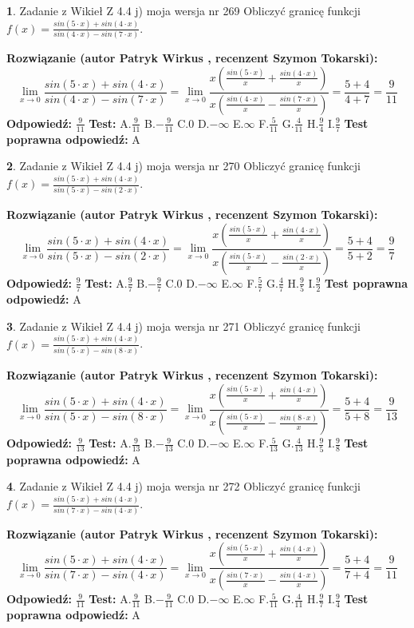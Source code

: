 \documentclass[12pt, a4paper]{article}
\theoremstyle{definition} %
\newtheorem{zad}{}
\newcommand{\zadStart}[1]{\begin{zad}#1\newline}
\newcommand{\zadStop}{\end{zad}}
\newcommand{\rozwStart}[2]{\noindent \textbf{Rozwiązanie (autor #1 , recenzent #2): }\newline}
\newcommand{\rozwStop}{\newline}
\newcommand{\odpStart}{\noindent \textbf{Odpowiedź:}\newline}
\newcommand{\odpStop}{\newline}
\newcommand{\testStart}{\noindent \textbf{Test:}\newline}
\newcommand{\testStop}{\newline}
\newcommand{\kluczStart}{\noindent \textbf{Test poprawna odpowiedź:}\newline}
\newcommand{\kluczStop}{\newline}
\begin{document}
\zadStart{Zadanie z Wikieł Z 4.4 j) moja wersja nr 269}
Obliczyć granicę funkcji $f(x)=\frac{sin(5\cdot x) +sin(4\cdot x)}{sin(4\cdot x) -sin(7\cdot x)}$.
\zadStop
\rozwStart{Patryk Wirkus}{Szymon Tokarski}
$$\lim\limits_{x\to 0}\frac{sin(5\cdot x) +sin(4\cdot x)}{sin(4\cdot x) -sin(7\cdot x)}=\lim\limits_{x\to 0}\frac{x(\frac{sin(5\cdot x)}{x}+\frac{sin(4\cdot x)}{x})}{x(\frac{sin(4\cdot x)}{x}-\frac{sin(7\cdot x)}{x})}=\frac{5+4}{4+7} = \frac{9}{11}$$
\rozwStop
\odpStart
$\frac{9}{11}$
\odpStop
\testStart
A.$\frac{9}{11}$
B.$-\frac{9}{11}$
C.$0$
D.$-\infty$
E.$\infty$
F.$\frac{5}{11}$
G.$\frac{4}{11}$
H.$\frac{9}{4}$
I.$\frac{9}{7}$
\testStop
\kluczStart
A
\kluczStop



\zadStart{Zadanie z Wikieł Z 4.4 j) moja wersja nr 270}
Obliczyć granicę funkcji $f(x)=\frac{sin(5\cdot x) +sin(4\cdot x)}{sin(5\cdot x) -sin(2\cdot x)}$.
\zadStop
\rozwStart{Patryk Wirkus}{Szymon Tokarski}
$$\lim\limits_{x\to 0}\frac{sin(5\cdot x) +sin(4\cdot x)}{sin(5\cdot x) -sin(2\cdot x)}=\lim\limits_{x\to 0}\frac{x(\frac{sin(5\cdot x)}{x}+\frac{sin(4\cdot x)}{x})}{x(\frac{sin(5\cdot x)}{x}-\frac{sin(2\cdot x)}{x})}=\frac{5+4}{5+2} = \frac{9}{7}$$
\rozwStop
\odpStart
$\frac{9}{7}$
\odpStop
\testStart
A.$\frac{9}{7}$
B.$-\frac{9}{7}$
C.$0$
D.$-\infty$
E.$\infty$
F.$\frac{5}{7}$
G.$\frac{4}{7}$
H.$\frac{9}{5}$
I.$\frac{9}{2}$
\testStop
\kluczStart
A
\kluczStop



\zadStart{Zadanie z Wikieł Z 4.4 j) moja wersja nr 271}
Obliczyć granicę funkcji $f(x)=\frac{sin(5\cdot x) +sin(4\cdot x)}{sin(5\cdot x) -sin(8\cdot x)}$.
\zadStop
\rozwStart{Patryk Wirkus}{Szymon Tokarski}
$$\lim\limits_{x\to 0}\frac{sin(5\cdot x) +sin(4\cdot x)}{sin(5\cdot x) -sin(8\cdot x)}=\lim\limits_{x\to 0}\frac{x(\frac{sin(5\cdot x)}{x}+\frac{sin(4\cdot x)}{x})}{x(\frac{sin(5\cdot x)}{x}-\frac{sin(8\cdot x)}{x})}=\frac{5+4}{5+8} = \frac{9}{13}$$
\rozwStop
\odpStart
$\frac{9}{13}$
\odpStop
\testStart
A.$\frac{9}{13}$
B.$-\frac{9}{13}$
C.$0$
D.$-\infty$
E.$\infty$
F.$\frac{5}{13}$
G.$\frac{4}{13}$
H.$\frac{9}{5}$
I.$\frac{9}{8}$
\testStop
\kluczStart
A
\kluczStop



\zadStart{Zadanie z Wikieł Z 4.4 j) moja wersja nr 272}
Obliczyć granicę funkcji $f(x)=\frac{sin(5\cdot x) +sin(4\cdot x)}{sin(7\cdot x) -sin(4\cdot x)}$.
\zadStop
\rozwStart{Patryk Wirkus}{Szymon Tokarski}
$$\lim\limits_{x\to 0}\frac{sin(5\cdot x) +sin(4\cdot x)}{sin(7\cdot x) -sin(4\cdot x)}=\lim\limits_{x\to 0}\frac{x(\frac{sin(5\cdot x)}{x}+\frac{sin(4\cdot x)}{x})}{x(\frac{sin(7\cdot x)}{x}-\frac{sin(4\cdot x)}{x})}=\frac{5+4}{7+4} = \frac{9}{11}$$
\rozwStop
\odpStart
$\frac{9}{11}$
\odpStop
\testStart
A.$\frac{9}{11}$
B.$-\frac{9}{11}$
C.$0$
D.$-\infty$
E.$\infty$
F.$\frac{5}{11}$
G.$\frac{4}{11}$
H.$\frac{9}{7}$
I.$\frac{9}{4}$
\testStop
\kluczStart
A
\kluczStop
\end{document}
